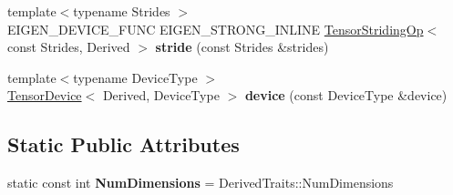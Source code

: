 \begin{DoxyCompactItemize}
\item 
\mbox{\label{class_eigen_1_1_tensor_base_a3d1e2494393302591784c0939641e937}} 
{\footnotesize template$<$typename Strides $>$ }\\E\+I\+G\+E\+N\+\_\+\+D\+E\+V\+I\+C\+E\+\_\+\+F\+U\+NC E\+I\+G\+E\+N\+\_\+\+S\+T\+R\+O\+N\+G\+\_\+\+I\+N\+L\+I\+NE \hyperlink{class_eigen_1_1_tensor_striding_op}{Tensor\+Striding\+Op}$<$ const Strides, Derived $>$ {\bfseries stride} (const Strides \&strides)
\item 
\mbox{\label{class_eigen_1_1_tensor_base_a59f3f88e7ceecd4648b1776ac018e375}} 
{\footnotesize template$<$typename Device\+Type $>$ }\\\hyperlink{class_eigen_1_1_tensor_device}{Tensor\+Device}$<$ Derived, Device\+Type $>$ {\bfseries device} (const Device\+Type \&device)
\end{DoxyCompactItemize}
\subsection*{Static Public Attributes}
\begin{DoxyCompactItemize}
\item 
\mbox{\label{class_eigen_1_1_tensor_base_aa6e25d24f93500e56a0f906ac8e74aed}} 
static const int {\bfseries Num\+Dimensions} = Derived\+Traits\+::\+Num\+Dimensions
\end{DoxyCompactItemize}
